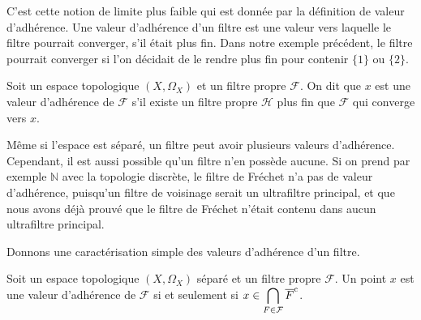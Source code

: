 C'est cette notion de limite plus faible qui est donnée par la définition de
valeur d'adhérence. Une valeur d'adhérence d'un filtre est une valeur vers
laquelle le filtre pourrait converger, s'il était plus fin. Dans notre exemple
précédent, le filtre pourrait converger si l'on décidait de le rendre plus fin
pour contenir $\{1\}$ ou $\{2\}$.

\begin{definition}
  Soit un espace topologique $(X,\Omega_X)$ et un filtre propre $\mathcal F$. On
  dit que $x$ est une valeur d'adhérence de $\mathcal F$ s'il existe un filtre
  propre $\mathcal H$ plus fin que $\mathcal F$ qui converge vers $x$.
\end{definition}

Même si l'espace est séparé, un filtre peut avoir plusieurs valeurs d'adhérence.
Cependant, il est aussi possible qu'un filtre n'en possède aucune. Si on prend
par exemple $\mathbb N$ avec la topologie discrète, le filtre de Fréchet n'a pas
de valeur d'adhérence, puisqu'un filtre de voisinage serait un ultrafiltre
principal, et que nous avons déjà prouvé que le filtre de Fréchet n'était
contenu dans aucun ultrafiltre principal.

Donnons une caractérisation simple des valeurs d'adhérence d'un filtre.

\begin{proposition}\label{prop.carac.adh}
  Soit un espace topologique $(X,\Omega_X)$ séparé et un filtre propre
  $\mathcal F$. Un point $x$ est une valeur d'adhérence de $\mathcal F$ si et
  seulement si $\displaystyle x\in \bigcap_{F\in\mathcal F} \overline{F}^{\mathrm c}$.
\end{proposition}

